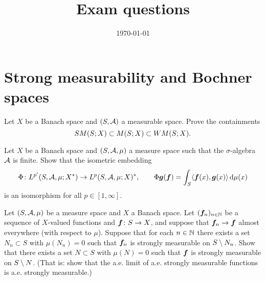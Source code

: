 \documentclass[a4paper,10pt]{amsbook}
\begin{document}
\title{Exam questions}
\date{\today}


\maketitle


\section{Strong measurability and Bochner spaces}

\begin{exercise}\label{ex:measurability-containments}
  Let $X$ be a Banach space and $(S,\mathcal{A})$ a measurable space.
  Prove the containments
  \begin{equation*}
    SM(S;X) \subset M(S;X) \subset WM(S;X).
  \end{equation*}
\end{exercise}

\begin{exercise}\label{ex:finite-sigma-alg-duality}
  Let $X$ be a Banach space and $(S,\mathcal{A},\mu)$ a measure space such that the $\sigma$-algebra $\mathcal{A}$ is finite.
  Show that the isometric embedding
  \begin{equation*}
    \Phi \colon L^{p'}(S,\mathcal{A},\mu;X^*) \rightarrow L^p(S,\mathcal{A},\mu;X)^*, \qquad \Phi \bm{g}(\bm{f}) = \int_S \langle \bm{f}(x), \bm{g}(x) \rangle \, \mathrm{d}\mu(x)
  \end{equation*}
  is an isomorphism for all $p \in [1,\infty]$.
\end{exercise}

\begin{exercise}\label{ex:sm-limits}
  Let $(S,\mathcal{A},\mu)$ be a measure space and $X$ a Banach space.
  Let $(\bm{f}_{n})_{n \in \mathbb{N}}$ be a sequence of $X$-valued functions and $\bm{f} \colon S \rightarrow X$, and suppose that $\bm{f}_{n} \to \bm{f}$ almost everywhere (with respect to $\mu$).
  Suppose that for each $n \in \mathbb{N}$ there exists a set $N_{n} \subset S$ with $\mu(N_{n}) = 0$ such that $\bm{f}_{n}$ is strongly measurable on $S \setminus N_{n}$.
  Show that there exists a set $N \subset S$ with $\mu(N) = 0$ such that $\bm{f}$ is strongly measurable on $S \setminus N$.
  (That is: show that the a.e. limit of a.e. strongly measurable functions is a.e. strongly measurable.)
\end{exercise}
\end{document}

